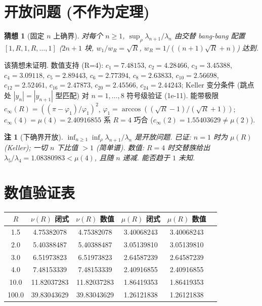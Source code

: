 \documentclass[UTF8]{ctexart}
\newtheorem{remark}[theorem]{注}
\newtheorem{conjecture}[theorem]{猜想}
\begin{document}
\section{开放问题 (不作为定理)}

\begin{conjecture}[固定 $n$ 上确界]
对每个 $n \geq 1$, $\sup_{\rho} \lambda_{n+1}/\lambda_n$ 由交替 bang-bang 配置
$[1, R, 1, R, \dots, 1]$ ($2n+1$ 块, $w_1/w_R = \sqrt{R}$, $w_R = 1/((n+1)\sqrt{R}+n)$) 达到.
\end{conjecture}

该猜想未证明. 数值支持 (R=4): $c_1 = 7.48153$, $c_2 = 4.28466$, $c_3 = 3.45388$,
$c_4 = 3.09118$, $c_5 = 2.89443$, $c_6 = 2.77394$, $c_8 = 2.63833$, $c_{10} = 2.56698$,
$c_{12} = 2.52461$, $c_{16} = 2.47873$, $c_{20} = 2.45566$, $c_{24} = 2.44243$;
Keller 变分条件 (跳点处 $|y_n| = |y_{n+1}|$ 型匹配) 对 $n = 1,\dots,8$ 符号级验证 (1e-11).
能带极限 $c_{\infty}(R) = ((\pi-\varphi_1)/\varphi_1)^2$,
$\varphi_1 = \arccos((\sqrt{R}-1)/(\sqrt{R}+1))$; $c_{\infty}(4) = \mu(4) = 2.40916855$
系 $R = 4$ 巧合 ($c_{\infty}(2) = 1.55403629 \neq \mu(2)$).

\begin{remark}[下确界开放]
$\inf_{n\geq 1}\inf_{\rho}\lambda_{n+1}/\lambda_n$ 是开放问题.
已证: $n=1$ 时为 $\mu(R)$ (Keller); 一切 $n$ 下比值 $> 1$ (简单谱).
数值: $R=4$ 时交替族给出 $\lambda_5/\lambda_4 = 1.08380983 < \mu(4)$, 且随 $n$ 递减.
能否趋于 $1$ 未知.
\end{remark}

\section{数值验证表}

\begin{center}
\begin{tabular}{cccccc}
	\toprule
	$R$ & $\nu(R)$ 闭式 & $\nu(R)$ 数值 & $\mu(R)$ 闭式 & $\mu(R)$ 数值 \\
	\midrule
	1.5 & 4.75382078 & 4.75382078 & 3.40068243 & 3.40068243 \\
	2.0 & 5.40388487 & 5.40388487 & 3.05139810 & 3.05139810 \\
	3.0 & 6.51973823 & 6.51973823 & 2.64587239 & 2.64587239 \\
	4.0 & 7.48153339 & 7.48153339 & 2.40916855 & 2.40916855 \\
	10.0 & 11.82037283 & 11.82037283 & 1.86419353 & 1.86419353 \\
	100.0 & 39.83043629 & 39.83043629 & 1.26121838 & 1.26121838 \\
	\bottomrule
\end{tabular}
\end{center}
\end{document}
